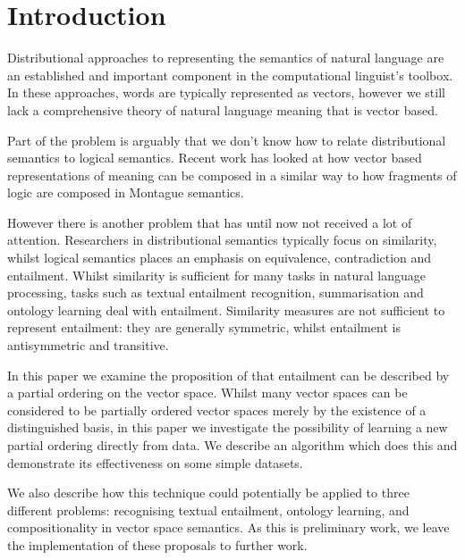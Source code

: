 \section{Introduction}

Distributional approaches to representing the semantics of natural language
are an established and important component in the computational
linguist's toolbox. In these approaches, words are typically
represented as vectors, however we still lack a comprehensive theory
of natural language meaning that is vector based.

Part of the problem is arguably that we don't know how to relate
distributional semantics to logical semantics. Recent work has looked
at how vector based representations of meaning can be composed in a
similar way to how fragments of logic are composed in Montague
semantics.

However there is another problem that has until now not received a lot
of attention. Researchers in distributional semantics typically focus
on similarity, whilst logical semantics places an emphasis on
equivalence, contradiction and entailment. Whilst similarity is
sufficient for many tasks in natural language processing, tasks such
as textual entailment recognition, summarisation and ontology learning
deal with entailment. Similarity measures are not sufficient to
represent entailment: they are generally symmetric, whilst entailment
is antisymmetric and transitive.

In this paper we examine the proposition of  that
entailment can be described by a partial ordering on the vector
space. Whilst many vector spaces can be considered to be partially
ordered vector spaces merely by the existence of a distinguished
basis, in this paper we investigate the possibility of learning a new
partial ordering directly from data. We describe an algorithm which
does this and demonstrate its effectiveness on some simple datasets.

We also describe how this technique could potentially be applied to
three different problems: recognising textual entailment, ontology
learning, and compositionality in vector space semantics. As this is
preliminary work, we leave the implementation of these proposals to
further work.
